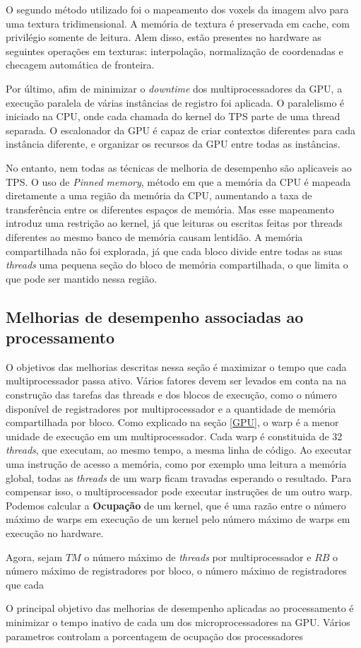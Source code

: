   O segundo método utilizado foi o mapeamento dos voxels da imagem alvo para uma
textura tridimensional. A memória de textura é preservada em cache, com privilégio
somente de leitura. Alem disso, estão presentes no hardware as seguintes operações
em texturas: interpolação, normalização de coordenadas e checagem automática de
fronteira.

  Por último, afim de minimizar o \textit{downtime} dos multiprocessadores da GPU, a
execução paralela de várias instâncias de registro foi aplicada. O paralelismo
é iniciado na CPU, onde cada chamada do kernel do TPS parte de uma thread separada.
O escalonador da GPU é capaz de criar contextos diferentes para cada instância
diferente, e organizar os recursos da GPU entre todas as instâncias.

  No entanto, nem todas as técnicas de melhoria de desempenho são aplicaveis ao
TPS. O uso de \textit{Pinned memory}, método em que a memória da CPU é mapeada
diretamente a uma região da memória da CPU, aumentando a taxa de transferência entre
os diferentes espaços de memória. Mas esse mapeamento introduz uma restrição ao
kernel, já que leituras ou escritas feitas por threads diferentes ao mesmo banco
de memória causam lentidão. A memória compartilhada não foi explorada, já que
cada bloco divide entre todas as suas \textit{threads} uma pequena seção do
bloco de memória compartilhada, o que limita o que pode ser mantido nessa região.

\subsection{Melhorias de desempenho associadas ao processamento}

  O objetivos das melhorias descritas nessa seção é maximizar o tempo que cada
multiprocessador passa ativo. Vários fatores devem ser levados em conta na
na construção das tarefas das threads e dos blocos de execução, como o número
disponível de registradores por multiprocessador e a quantidade de memória
compartilhada por bloco. Como explicado na seção \ref{GPU}, o
warp é a menor unidade de execução em um multiprocessador. Cada warp é
constituida de 32 \textit{threads}, que executam, ao mesmo tempo, a mesma linha de
código. Ao executar uma instrução de acesso a memória, como por exemplo uma leitura
a memória global, todas as \textit{threads} de um warp ficam travadas esperando o
resultado. Para compensar isso, o multiprocessador pode executar instruções de um
outro warp. Podemos calcular a \textbf{Ocupação} de um kernel, que é uma razão
entre o número máximo de warps em execução de um kernel pelo número máximo de warps
em execução no hardware.

  Agora, sejam $TM$ o número máximo de
\textit{threads} por multiprocessador e $RB$ o número máximo de registradores por
bloco, o número máximo de registradores que cada


  O principal objetivo das melhorias de desempenho aplicadas ao processamento é
minimizar o tempo inativo de cada um dos microprocessadores na GPU. Vários
parametros controlam a porcentagem de ocupação dos processadores
